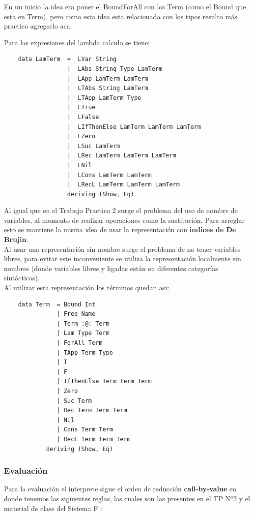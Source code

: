 \documentclass[12pt, titlepage, a4paper]{article}
\begin{document}
En un inicio la idea era poner el BoundForAll con los Term (como el Bound que esta en Term), pero como esta idea esta relacionada con 
los tipos resulto más practico agregarlo aca.

\noindent Para las expresiones del lambda calculo se tiene:
\begin{verbatim}
    data LamTerm  =  LVar String
                  |  LAbs String Type LamTerm
                  |  LApp LamTerm LamTerm
                  |  LTAbs String LamTerm
                  |  LTApp LamTerm Type
                  |  LTrue 
                  |  LFalse
                  |  LIfThenElse LamTerm LamTerm LamTerm
                  |  LZero
                  |  LSuc LamTerm
                  |  LRec LamTerm LamTerm LamTerm
                  |  LNil
                  |  LCons LamTerm LamTerm
                  |  LRecL LamTerm LamTerm LamTerm
                  deriving (Show, Eq)
\end{verbatim}

Al igual que en el Trabajo Practico 2 \cite{tp2:lambdaCalculoSimpleTipado} surge el problema del uso de nombre de variables, al 
momento de realizar operaciones como la sustitución. Para arreglar esto se mantiene la misma idea de 
usar la representación con \textbf{indices de De Brujin}. \\

Al usar una representación sin nombre surge el problema de no tener variables libres,  
para evitar este inconveniente se utiliza la representación localmente sin nombres (donde variables libres y ligadas están 
en diferentes categorías sintácticas). \\

\noindent Al utilizar esta representación los términos quedan asi:
\begin{verbatim}
    data Term  = Bound Int
               | Free Name 
               | Term :@: Term
               | Lam Type Term
               | ForAll Term
               | TApp Term Type
               | T
               | F
               | IfThenElse Term Term Term
               | Zero
               | Suc Term
               | Rec Term Term Term
               | Nil
               | Cons Term Term
               | RecL Term Term Term
            deriving (Show, Eq)
\end{verbatim}

\subsubsection{Evaluación}
Para la evaluación el interprete sigue el orden de reducción \textbf{call-by-value} en donde tenemos las siguientes reglas, las cuales 
son las presentes en el TP Nº2 \cite{tp2:lambdaCalculoSimpleTipado} y el material de clase del Sistema F \cite{ALP:Polimorfismo}:
\end{document}

